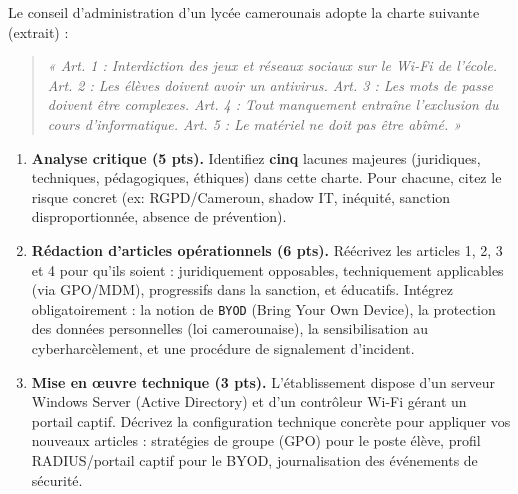 \documentclass[11pt]{article}
\begin{document}
\begin{exercice}
Le conseil d'administration d'un lycée camerounais adopte la charte suivante (extrait) : 
\begin{quote}
\textit{« Art. 1 : Interdiction des jeux et réseaux sociaux sur le Wi-Fi de l'école. Art. 2 : Les élèves doivent avoir un antivirus. Art. 3 : Les mots de passe doivent être complexes. Art. 4 : Tout manquement entraîne l'exclusion du cours d'informatique. Art. 5 : Le matériel ne doit pas être abîmé. »}
\end{quote}

\begin{enumerate}
    \item \textbf{Analyse critique (5 pts).} Identifiez \textbf{cinq} lacunes majeures (juridiques, techniques, pédagogiques, éthiques) dans cette charte. Pour chacune, citez le risque concret (ex: RGPD/Cameroun, shadow IT, inéquité, sanction disproportionnée, absence de prévention).
    
    \item \textbf{Rédaction d'articles opérationnels (6 pts).} Réécrivez les articles 1, 2, 3 et 4 pour qu'ils soient : juridiquement opposables, techniquement applicables (via GPO/MDM), progressifs dans la sanction, et éducatifs. Intégrez obligatoirement : la notion de \texttt{BYOD} (Bring Your Own Device), la protection des données personnelles (loi camerounaise), la sensibilisation au cyberharcèlement, et une procédure de signalement d'incident.
    
    \item \textbf{Mise en œuvre technique (3 pts).} L'établissement dispose d'un serveur Windows Server (Active Directory) et d'un contrôleur Wi-Fi gérant un portail captif. Décrivez la configuration technique concrète pour appliquer vos nouveaux articles : stratégies de groupe (GPO) pour le poste élève, profil RADIUS/portail captif pour le BYOD, journalisation des événements de sécurité.
\end{enumerate}
\end{exercice}
\end{document}

